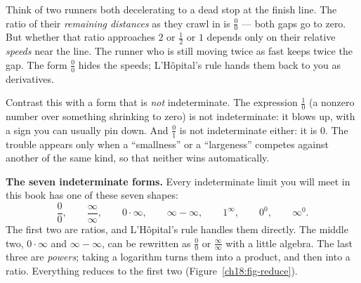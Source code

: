 \begin{intuitionbox}
Think of two runners both decelerating to a dead stop at the finish line. The ratio
of their \emph{remaining distances} as they crawl in is $\tfrac{0}{0}$ --- both gaps
go to zero. But whether that ratio approaches $2$ or $\tfrac12$ or $1$ depends only on
their relative \emph{speeds} near the line. The runner who is still moving twice as
fast keeps twice the gap. The form $\tfrac{0}{0}$ hides the speeds; L'H\^opital's rule
hands them back to you as derivatives.
\end{intuitionbox}

Contrast this with a form that is \emph{not} indeterminate. The expression
$\tfrac{1}{0}$ (a nonzero number over something shrinking to zero) is not
indeterminate: it blows up, with a sign you can usually pin down. And $\tfrac{0}{1}$
is not indeterminate either: it is $0$. The trouble appears only when a
``smallness'' or a ``largeness'' competes against another of the same kind, so that
neither wins automatically.

\begin{focusbox}
\textbf{The seven indeterminate forms.} Every indeterminate limit you will meet in
this book has one of these seven shapes:
\[
\frac{0}{0},\qquad \frac{\infty}{\infty},\qquad 0\cdot\infty,\qquad
\infty-\infty,\qquad 1^{\infty},\qquad 0^{0},\qquad \infty^{0}.
\]
The first two are ratios, and L'H\^opital's rule handles them directly. The middle two,
$0\cdot\infty$ and $\infty-\infty$, can be rewritten as $\tfrac{0}{0}$ or
$\tfrac{\infty}{\infty}$ with a little algebra. The last three are \emph{powers}; taking a
logarithm turns them into a product, and then into a ratio. Everything reduces to
the first two (Figure~\ref{ch18:fig-reduce}).
\end{focusbox}

